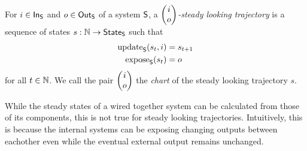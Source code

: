 \documentclass[DynamicalBook]{subfiles}
\begin{document}
\begin{definition}\label{def.steady_looking_trajectory_discrete}
  For $i \in \mathsf{In}_{\mathsf{S}}$ and $o \in \mathsf{Out}_{\mathsf{S}}$ of a system $\mathsf{S}$, a \emph{$\begin{pmatrix}{i} \\ {o} \end{pmatrix}$-steady
    looking trajectory} is a sequence of states $s : \mathbb{N} \to \mathsf{State}_{\mathsf{S}}$ such
  that
  \begin{align*}
    \mathrm{update}_{\mathsf{S}}(s_t, i) &= s_{t + 1} \\
    \mathrm{expose}_{\mathsf{S}}(s_t) &= o
  \end{align*}
  for all $t \in \mathbb{N}$. We call the pair $\begin{pmatrix}{i} \\ {o} \end{pmatrix}$ the \emph{chart} of the
  steady looking trajectory $s$.
\end{definition}

While the steady states of a wired together system can be calculated from those
of its components, this is not true for steady looking trajectories.
Intuitively, this is because the internal systems can be exposing changing
outputs between eachother even while the eventual external output remains
unchanged.
\end{document}
